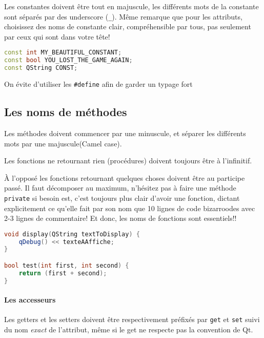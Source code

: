 Les constantes doivent être tout en majuscule, les différents mots de la
constante sont séparés par des underscore (\texttt{\_}). Même remarque que pour
les attributs, choisissez des noms de constante clair, compréhensible
par tous, pas seulement par ceux qui sont dans votre tête!

\begin{lstlisting}[language=C++]
const int MY_BEAUTIFUL_CONSTANT; 
const bool YOU_LOST_THE_GAME_AGAIN; 
const QString CONST;
\end{lstlisting}

\begin{exemple}
	On évite d'utiliser les \texttt{\#define} afin de garder un typage fort
\end{exemple}

\subsection{Les noms de méthodes}\label{les-noms-de-muxe9thodes}

Les méthodes doivent commencer par une minuscule, et séparer les
différents mots par une majuscule(Camel case).

Les fonctions ne retournant rien (procédures) doivent toujours être à
l'infinitif.

\`A l'opposé les fonctions 
retournant quelques choses doivent être au
participe passé. Il faut décomposer au maximum, n'hésitez pas à faire
une méthode \texttt{private} si besoin est, c'est toujours plus clair
d'avoir une fonction, dictant explicitement ce qu'elle fait par son nom
que 10 lignes de code bizarroodes avec 2-3 lignes de commentaire! Et donc, les noms de fonctions sont essentiels!!

\begin{lstlisting}[language=C++]
void display(QString textToDisplay) { 
    qDebug() << texteAAffiche; 
}

bool test(int first, int second) { 
	return (first + second);
} 
\end{lstlisting}

\paragraph{Les accesseurs}\label{les-accesseurs}

Les getters et les setters doivent être respectivement préfixés par
\texttt{get} et \texttt{set} suivi du nom \emph{exact} de l'attribut,
même si le get ne respecte pas la convention de Qt.

